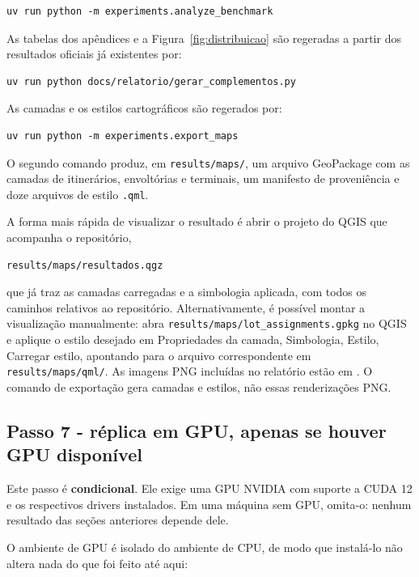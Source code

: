 \documentclass[12pt,a4paper]{article}
\begin{document}
\begin{verbatim}
uv run python -m experiments.analyze_benchmark
\end{verbatim}

As tabelas dos apêndices e a Figura~\ref{fig:distribuicao} são regeradas a
partir dos resultados oficiais já existentes por:

\begin{verbatim}
uv run python docs/relatorio/gerar_complementos.py
\end{verbatim}

As camadas e os estilos cartográficos são regerados por:

\begin{verbatim}
uv run python -m experiments.export_maps
\end{verbatim}

O segundo comando produz, em \texttt{results/maps/}, um arquivo
GeoPackage com as camadas de itinerários, envoltórias e terminais, um
manifesto de proveniência e doze arquivos de estilo \texttt{.qml}.

A forma mais rápida de visualizar o resultado é abrir o projeto do QGIS
que acompanha o repositório,

\begin{verbatim}
results/maps/resultados.qgz
\end{verbatim}

que já traz as camadas carregadas e a simbologia aplicada, com todos os
caminhos relativos ao repositório. Alternativamente, é possível montar a
visualização manualmente: abra
\texttt{results/maps/lot\_assignments.gpkg} no QGIS e aplique o estilo
desejado em Propriedades da camada, Simbologia, Estilo, Carregar estilo,
apontando para o arquivo correspondente em \texttt{results/maps/qml/}.
As imagens PNG incluídas no relatório estão em .
O comando de exportação gera camadas e estilos, não essas renderizações PNG.

\subsection{Passo 7 - réplica em GPU, apenas se houver GPU disponível}
\label{sec:guia-gpu}

Este passo é \textbf{condicional}. Ele exige uma GPU NVIDIA com suporte a
CUDA 12 e os respectivos drivers instalados. Em uma máquina sem GPU,
omita-o: nenhum resultado das seções anteriores depende dele.

O ambiente de GPU é isolado do ambiente de CPU, de modo que instalá-lo
não altera nada do que foi feito até aqui:
\end{document}

